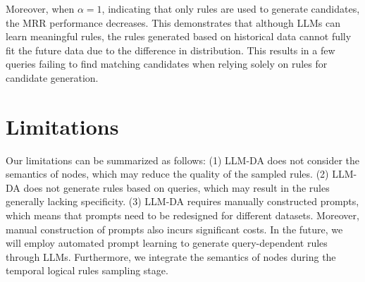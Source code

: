 \documentclass{article}
\begin{document}
Moreover, when $\alpha=1$, indicating that only rules are used to generate candidates, the MRR performance decreases. This demonstrates that although LLMs can learn meaningful rules, the rules generated based on historical data cannot fully fit the future data due to the difference in distribution. This results in a few queries failing to find matching candidates when relying solely on rules for candidate generation.

\section{Limitations}\label{limitations}
Our limitations can be summarized as follows: (1) LLM-DA does not consider the semantics of nodes, which may reduce the quality of the sampled rules. (2) LLM-DA does not generate rules based on queries, which may result in the rules generally lacking specificity. (3) LLM-DA requires manually constructed prompts, which means that prompts need to be redesigned for different datasets. Moreover, manual construction of prompts also incurs significant costs. In the future, we will employ automated prompt learning to generate query-dependent rules through LLMs.
Furthermore, we integrate the semantics of nodes during the temporal logical rules sampling stage.

\clearpage

\newpage
%
\end{document}
